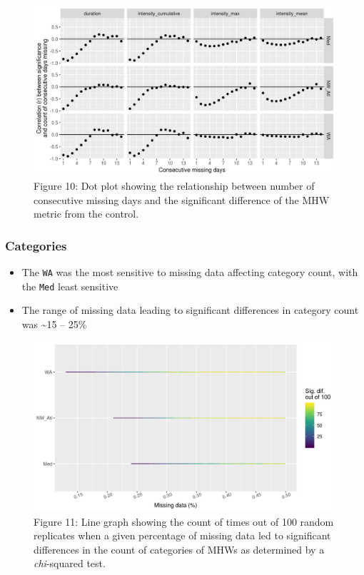 \documentclass[]{article}
\providecommand{\tightlist}{%
  \setlength{\itemsep}{0pt}\setlength{\parskip}{0pt}}
\begin{document}
\begin{figure}
\centering
\includegraphics{../docs/articles/missing_data_files/figure-html/event-cor-1.png}
\caption{Figure 10: Dot plot showing the relationship between number of
consecutive missing days and the significant difference of the MHW
metric from the control.}
\end{figure}

\subsubsection{Categories}\label{categories-1}

\begin{itemize}
\tightlist
\item
  The \texttt{WA} was the most sensitive to missing data affecting
  category count, with the \texttt{Med} least sensitive
\item
  The range of missing data leading to significant differences in
  category count was \textasciitilde{}15 -- 25\%
\end{itemize}

\begin{figure}
\centering
\includegraphics{../docs/articles/missing_data_files/figure-html/chi-pair-plot-1.png}
\caption{Figure 11: Line graph showing the count of times out of 100
random replicates when a given percentage of missing data led to
significant differences in the count of categories of MHWs as determined
by a \emph{chi}-squared test.}
\end{figure}
\end{document}
